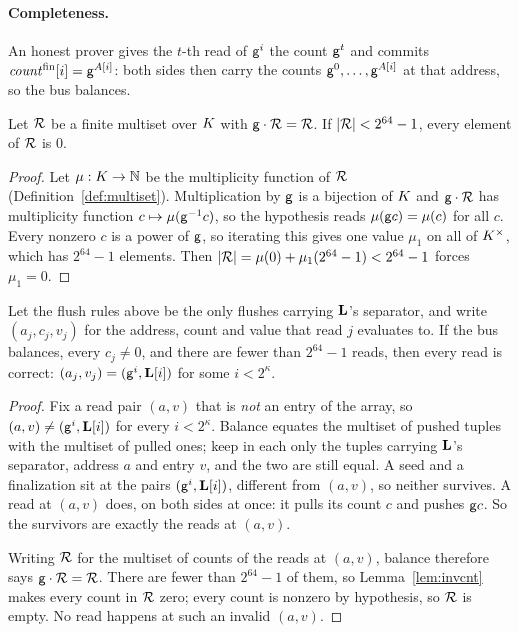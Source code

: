 \paragraph{Completeness.} An honest prover gives the $t$-th read of $\mathsf{g}^{i}$ the count $\mathsf{g}^{t}$ and commits $\mathit{count}^{\mathrm{fin}}[i]=\mathsf{g}^{A[i]}$: both sides then carry the counts $\mathsf{g}^{0},\dots,\mathsf{g}^{A[i]}$ at that address, so the bus balances.

\begin{lemma}\label{lem:invcnt}
Let $\mathcal{R}$ be a finite multiset over $K$ with $\mathsf{g}\cdot\mathcal{R}=\mathcal{R}$. If $|\mathcal{R}|<2^{64}-1$, every element of $\mathcal{R}$ is $0$.
\end{lemma}

\begin{proof}
Let $\mu:K\to\mathbb{N}$ be the multiplicity function of $\mathcal{R}$ (Definition~\ref{def:multiset}). Multiplication by $\mathsf{g}$ is a bijection of $K$ and $\mathsf{g}\cdot\mathcal{R}$ has multiplicity function $c\mapsto\mu(\mathsf{g}^{-1}c)$, so the hypothesis reads $\mu(\mathsf{g} c)=\mu(c)$ for all $c$. Every nonzero $c$ is a power of $\mathsf{g}$, so iterating this gives one value $\mu_1$ on all of $K^{\times}$, which has $2^{64}-1$ elements. Then $|\mathcal{R}|=\mu(0)+\mu_1(2^{64}-1)<2^{64}-1$ forces $\mu_1=0$.
\end{proof}

\begin{theorem}\label{thm:omc}
Let the flush rules above be the only flushes carrying $\mathbf{L}$'s separator, and write $(a_j,c_j,v_j)$ for the address, count and value that read $j$ evaluates to. If the bus balances, every $c_j\neq0$, and there are fewer than $2^{64}-1$ reads, then every read is correct: $(a_j,v_j)=(\mathsf{g}^{i},\mathbf{L}[i])$ for some $i<2^{\kappa}$.
\end{theorem}

\begin{proof}
Fix a read pair $(a,v)$ that is \emph{not} an entry of the array, so $(a,v)\neq(\mathsf{g}^{i},\mathbf{L}[i])$ for every $i<2^{\kappa}$. Balance equates the multiset of pushed tuples with the multiset of pulled ones; keep in each only the tuples carrying $\mathbf{L}$'s separator, address $a$ and entry $v$, and the two are still equal. A seed and a finalization sit at the pairs $(\mathsf{g}^{i},\mathbf{L}[i])$, different from $(a,v)$, so neither survives. A read at $(a,v)$ does, on both sides at once: it pulls its count $c$ and pushes $\mathsf{g} c$. So the survivors are exactly the reads at $(a,v)$.

Writing $\mathcal{R}$ for the multiset of counts of the reads at $(a,v)$, balance therefore says $\mathsf{g}\cdot\mathcal{R}=\mathcal{R}$. There are fewer than $2^{64}-1$ of them, so Lemma~\ref{lem:invcnt} makes every count in $\mathcal{R}$ zero; every count is nonzero by hypothesis, so $\mathcal{R}$ is empty. No read happens at such an invalid $(a,v)$.

\end{proof}

